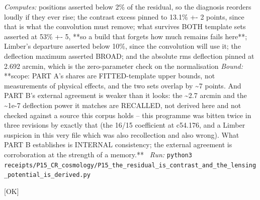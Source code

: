 \begin{description}
\emph{Computes:} positions asserted below 2\% of the residual, so the diagnosis reorders loudly if they ever rise; the contrast excess pinned to 13.1\% +- 2 points, since that is what the convolution must remove; what survives BOTH template sets asserted at 53\% +- 5, **so a build that forgets how much remains fails here**; Limber's departure asserted below 10\%, since the convolution will use it; the deflection maximum asserted BROAD; and the absolute rms deflection pinned at 2.692 arcmin, which is the zero-parameter check on the normalisation
 \emph{Bound:} **scope: PART A's shares are FITTED-template upper bounds, not measurements of physical effects, and the two sets overlap by \textasciitilde{}7 points. And PART B's external agreement is weaker than it looks: the \textasciitilde{}2.7 arcmin and the \textasciitilde{}1e-7 deflection power it matches are RECALLED, not derived here and not checked against a source this corpus holds -- this programme was bitten twice in three revisions by exactly that (the 16/15 coefficient at c54.176, and a Limber suspicion in this very file which was also recollection and also wrong). What PART B establishes is INTERNAL consistency; the external agreement is corroboration at the strength of a memory.**
\ \emph{Run:} \texttt{python3 receipts/P15\_CR\_cosmology/P15\_the\_residual\_is\_contrast\_and\_the\_lensing\_potential\_is\_derived.py}
\item[\label{rcpt:P15_the_phase_is_the_driving_and_the_undriven_arms_agree}\texttt{P15\_the\_phase\_is\_the\_driving\_and\_the\_undriven\_arms\_agree}]\hfill\textsf{[OK]}\\

\end{description}
